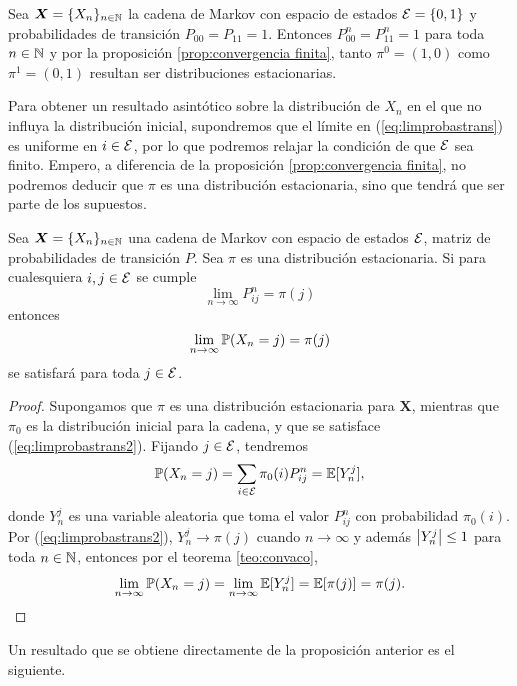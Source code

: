 \begin{example} \label{ej:vaquero 2 estados}
    Sea $\bm X = \{X_n\}_{n \in \mathbb{N}}$ la cadena de Markov con espacio de estados $\mathcal{E} = \{0,1\}$ y probabilidades de transición $P_{00} = P_{11} = 1$. Entonces $P_{00}^n = P_{11}^n = 1$ para toda $n \in \mathbb{N}$ y por la proposición \ref{prop:convergencia finita}, tanto $\pi^0 = (1,0)$ como $\pi^1 = (0,1)$ resultan ser distribuciones estacionarias.
\end{example}

Para obtener un resultado asintótico sobre la distribución de $X_n$ en el que no influya la distribución inicial, supondremos que el límite en (\ref{eq:limprobastrans}) es uniforme en $i \in \mathcal{E}$, por lo que podremos relajar la condición de que $\mathcal{E}$ sea finito. Empero, a diferencia de la proposición \ref{prop:convergencia finita}, no podremos deducir que $\pi$ es una distribución estacionaria, sino que tendrá que ser parte de los supuestos.

\begin{proposition} \label{prop:convergencia distribucion}
    Sea $\bm X = \{X_n\}_{n \in \mathbb{N}}$ una cadena de Markov con espacio de estados $\mathcal{E}$, matriz de probabilidades de transición $P$. Sea $\pi$ es una distribución estacionaria. Si para cualesquiera $i, j \in \mathcal{E}$ se cumple
    \begin{equation}
        \lim_{n \to \infty} P_{ij}^n = \pi(j)  \label{eq:limprobastrans2}
    \end{equation}
    entonces 
    \[
    \lim_{n \to \infty} \mathbb{P}(X_n = j) = \pi(j)    
    \]
    se satisfará para toda $j \in \mathcal{E}$.
\end{proposition}

\begin{proof}
    Supongamos que $\pi$ es una distribución estacionaria para $\bm X$, mientras que $\pi_0$ es la distribución inicial para la cadena, y que se satisface (\ref{eq:limprobastrans2}). Fijando $j \in \mathcal{E}$, tendremos
    \[
        \mathbb{P}(X_n = j) = \sum_{i \in \mathcal{E}} \pi_0(i) P_{ij}^n = \mathbb{E}[Y_n^j],
    \]
    donde $Y_n^j$ es una variable aleatoria que toma el valor $P_{ij}^n$ con probabilidad $\pi_0(i)$. Por (\ref{eq:limprobastrans2}), $Y_n^j \to \pi(j)$ cuando $n \to \infty$ y además $\left\lvert Y_n^j \right\rvert \leq 1$ para toda $n \in \mathbb{N}$, entonces por el teorema \ref{teo:convaco},
    \[
        \lim_{n \to \infty} \mathbb{P}(X_n = j) = \lim_{n \to \infty} \mathbb{E}[Y_n^j] = \mathbb{E}[\pi(j)] = \pi(j). \qedhere
    \]
\end{proof}

Un resultado que se obtiene directamente de la proposición anterior es el siguiente.

